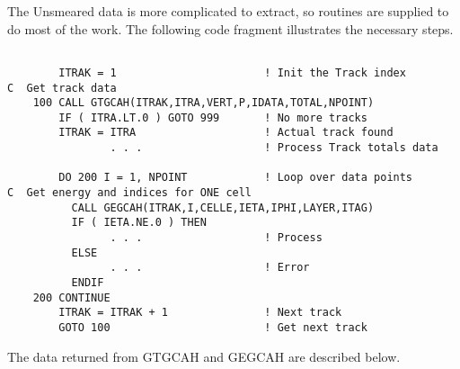The Unsmeared data is more complicated to extract, so routines are supplied to
do most of the work. The following code fragment illustrates the necessary
steps.

\begin{verbatim}

        ITRAK = 1                       ! Init the Track index
C  Get track data
    100 CALL GTGCAH(ITRAK,ITRA,VERT,P,IDATA,TOTAL,NPOINT)
        IF ( ITRA.LT.0 ) GOTO 999       ! No more tracks
        ITRAK = ITRA                    ! Actual track found
                . . .                   ! Process Track totals data

        DO 200 I = 1, NPOINT            ! Loop over data points
C  Get energy and indices for ONE cell
          CALL GEGCAH(ITRAK,I,CELLE,IETA,IPHI,LAYER,ITAG)
          IF ( IETA.NE.0 ) THEN
                . . .                   ! Process
          ELSE
                . . .                   ! Error
          ENDIF
    200 CONTINUE
        ITRAK = ITRAK + 1               ! Next track
        GOTO 100                        ! Get next track

\end{verbatim}

The data returned from GTGCAH and GEGCAH are described below.

